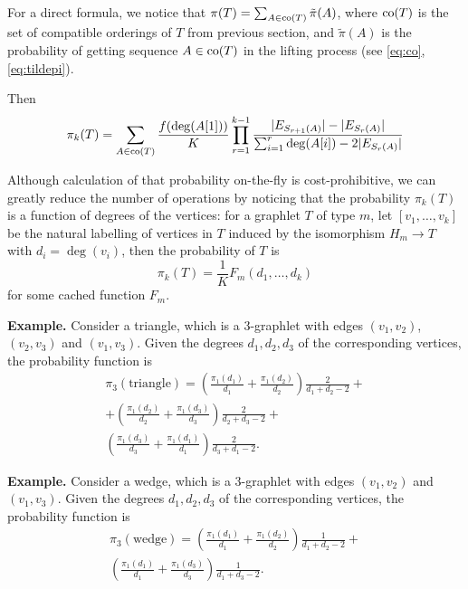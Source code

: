 	For a direct formula, we notice that $\pi(T) = \sum_{A\in \mathrm{co}(T)} \tilde\pi(A)$, where $\mathrm{co}(T)$ is the set of compatible orderings of $T$ from previous section, and $\tilde\pi(A)$ is the probability of getting sequence $A\in \mathrm{co}(T)$ in the lifting process (see \eqref{eq:co},\eqref{eq:tildepi}).

	Then 
	\begin{equation}
	\label{eq:direct}
		\pi_k(T) = \sum_{A\in\mathrm{co}(T)} \frac{f(\mathrm{deg}(A[1]))}{K} \prod_{r=1}^{k-1} \frac{|E_{S_{r+1}(A)}| - |E_{S_r(A)}|}{\sum_{i=1}^r \mathrm{deg}(A[i]) - 2|E_{S_r(A)}|}
	\end{equation}
	
	Although calculation of that probability on-the-fly is cost-prohibitive, we can greatly reduce the number of operations by noticing that the probability $\pi_k(T)$ is a 
	function of degrees of the vertices: for a graphlet $T$ of type $m$, let $[v_1, \ldots, v_k]$ be the natural labelling of vertices in $T$ induced by the isomorphism $H_m \rightarrow T$ with $d_i = \deg(v_i)$, then the probability of $T$ is
	\begin{equation*}
	    \pi_k(T) =\frac{1}{K} F_m(d_1, \ldots, d_k)
	\end{equation*}
    for some cached function $F_m$.
	
	\textbf{Example.} Consider a triangle, which is a 3-graphlet with edges $(v_1,v_2)$, 
	$(v_2, v_3)$ and $(v_1,v_3)$. Given the degrees $d_1, d_2, d_3$ of the corresponding 
	vertices, the probability function is
	\begin{multline}
	\label{prob:triangle}
		\pi_3(\mathrm{triangle}) = \left( \frac{\pi_1(d_1)}{d_1} + 
		\frac{\pi_1(d_2)}{d_2}\right) \frac{2}{d_1+d_2-2} +\\ 
		+ \left( \frac{\pi_1(d_2)}{d_2} + \frac{\pi_1(d_3)}{d_3}\right) 
		\frac{2}{d_2+d_3-2} +\\
		\left( \frac{\pi_1(d_3)}{d_3} + \frac{\pi_1(d_1)}{d_1}\right) 
		\frac{2}{d_3+d_1-2}.
	\end{multline}
	
	\textbf{Example.} Consider a wedge, which is a 3-graphlet with edges $(v_1,v_2)$ and 
	$(v_1,v_3)$. Given the degrees $d_1, d_2, d_3$ of the corresponding 
	vertices, the probability function is
	\begin{multline}
	\label{prob:wedge}
		\pi_3(\mathrm{wedge}) = \left( \frac{\pi_1(d_1)}{d_1} + \frac{\pi_1(d_2)}{d_2}\right) \frac{1}{d_1+d_2-2} +\\
		\left( \frac{\pi_1(d_1)}{d_1} + \frac{\pi_1(d_3)}{d_3}\right) \frac{1}{d_1+d_3-2}.
	\end{multline}

